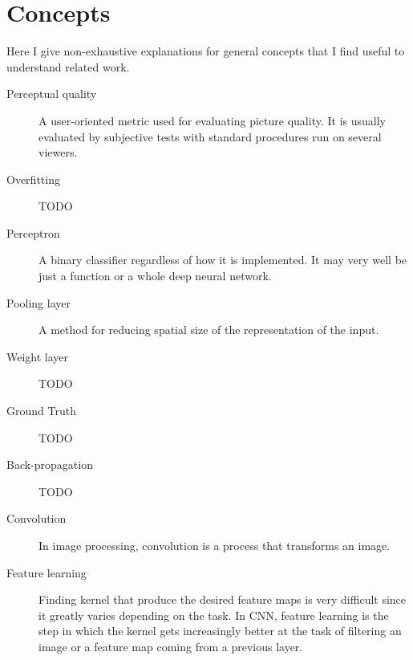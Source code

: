 
\chapter{Concepts}
\label{sec:concepts}


Here I give non-exhaustive explanations for general concepts that I find useful to understand related work.

\begin{description}

  \item[Perceptual quality]
  A user-oriented metric used for evaluating picture quality.
  It is usually evaluated by subjective tests with standard procedures run on several viewers. \cite{Lin2011}

  \item[Overfitting]
  TODO
  \todo[inline]{}

  \item[Perceptron]
  A binary classifier regardless of how it is implemented. It may very well be just a function or a whole deep neural network.

  \item[Pooling layer]
  A method for reducing spatial size of the representation of the input.

  \item[Weight layer]
  TODO
  \todo[inline]{}

  \item[Ground Truth]
  TODO
  \todo[inline]{}

  \item[Back-propagation]
  TODO
  \todo[inline]{}

  \item[Convolution]
  In image processing, convolution is a process that transforms an image.

  \item[Feature learning]
  Finding kernel that produce the desired feature maps is very difficult since it greatly varies depending on the task.
  In CNN, feature learning is the step in which the kernel gets increasingly better at the task of filtering an image or a feature map coming from a previous layer.


\end{description}
